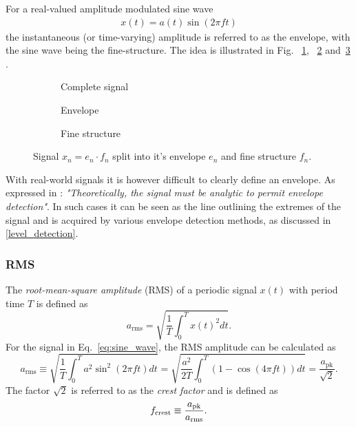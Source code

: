 \documentclass[../main2.tex]{subfiles}
\providecommand{\rootdir}{..}
\begin{document}
For a real-valued amplitude modulated sine wave
\begin{align}
x(t) = a(t)\sin(2 \pi f t)
\end{align}
the instantaneous (or time-varying) amplitude is referred to as the envelope, with the sine wave being the fine-structure. The idea is illustrated in Fig. ~\ref{fig:signal_env_fine_struct}, ~\ref{fig:signal_env} and~\ref{fig:signal_fine_struct} . 
\begin{figure}
\captionsetup{justification=centering}
\begin{subfigure}{\linewidth}
\centering
\centerline{}
\caption{Complete signal}
\label{fig:signal_env_fine_struct}
\end{subfigure}
\par\bigskip
\begin{subfigure}{.5\linewidth}
\centering

\caption{Envelope}
\label{fig:signal_env}
\end{subfigure}
\begin{subfigure}{.5\linewidth}
\centering

\caption{Fine structure}
\label{fig:signal_fine_struct}
\end{subfigure}%
\caption{Signal $x_n = e_n\cdot f_n$ split into it's envelope $e_n$ and fine structure $f_n$.}
\label{fig:analytic_signal}
\end{figure}

With real-world signals it is however difficult to clearly define an envelope. As expressed in \cite{bedrosian1962analytic}: \emph{"Theoretically, the signal must be analytic to permit envelope detection"}. In such cases it can be seen as the line outlining the extremes of the signal and is acquired by various envelope detection methods, as discussed in \ref{level_detection}. 
\subsubsection{RMS}
The \emph{root-mean-square amplitude} (RMS) of a periodic signal $x(t)$ with period time $T$ is defined as
\begin{equation}
a_\text{rms} = \sqrt{ \frac{1}{T} \int_{0}^{T} x(t)^2 dt }.
\end{equation}
For the signal in Eq.~\eqref{eq:sine_wave}, the RMS amplitude can be calculated as
\begin{equation}
a_\text{rms} \equiv
\sqrt{ \frac{1}{T} \int_{0}^{T} a^2 \sin^2 (2 \pi f t) dt } =
\sqrt{ \frac{a^2}{2T} \int_{0}^{T}\left( 1 - \cos (4 \pi f t) \right) dt } =
\frac{a_\text{pk}}{\sqrt 2}.\label{eq:a_rms}
\end{equation}
The factor $\sqrt 2$ is referred to as the \emph{crest factor} and is defined as
\begin{align}
f_\text{crest} \equiv \frac{a_\text{pk}}{a_\text{rms}}. \label{eq:crest_factor}
\end{align}
\end{document}
